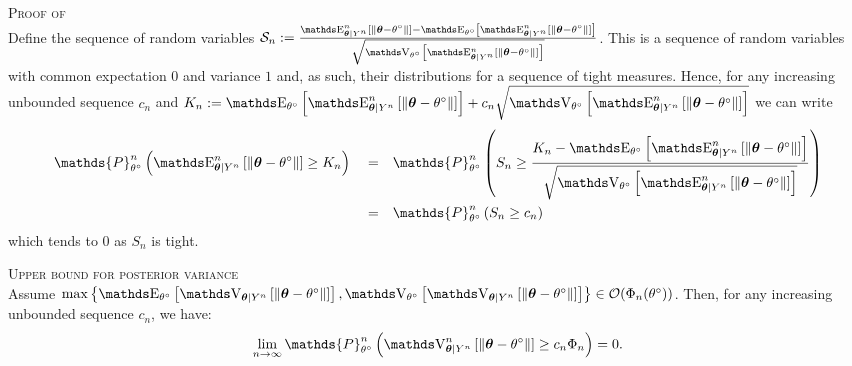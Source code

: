 \begin{pro}\label{pro2.4}{\textsc{Proof of }\\}
Define the sequence of random variables $\mathcal{S}_{n} := \frac{\E_{\boldsymbol{\theta} \vert Y^{n}}^{n}\left[\Vert \boldsymbol{\theta} - \theta^{\circ} \Vert \right] - \E_{\theta^{\circ}}\left[\E_{\boldsymbol{\theta} \vert Y^{n}}^{n}\left[\Vert \boldsymbol{\theta} - \theta^{\circ} \Vert \right]\right]}{\sqrt{\V_{\theta^{\circ}}\left[\E_{\boldsymbol{\theta} \vert Y^{n}}^{n}\left[\Vert \boldsymbol{\theta} - \theta^{\circ} \Vert \right]\right]}}$.
This is a sequence of random variables with common expectation $0$ and variance $1$ and, as such, their distributions for a sequence of tight measures.
Hence, for any increasing unbounded sequence $c_{n}$ and $K_{n} := \E_{\theta^{\circ}}\left[\E_{\boldsymbol{\theta} \vert Y^{n}}^{n}\left[\Vert \boldsymbol{\theta} - \theta^{\circ} \Vert \right]\right] + c_{n} \sqrt{\V_{\theta^{\circ}}\left[\E_{\boldsymbol{\theta} \vert Y^{n}}^{n}\left[\Vert \boldsymbol{\theta} - \theta^{\circ} \Vert \right]\right]}$ we can write
\begin{alignat*}{3}
& \mathds{P}_{\theta^{\circ}}^{n}\left(\E_{\boldsymbol{\theta} \vert Y^{n}}^{n}\left[\Vert \boldsymbol{\theta} - \theta^{\circ} \Vert \right] \geq K_{n}\right) && = && \mathds{P}_{\theta^{\circ}}^{n}\left(S_{n} \geq \frac{K_{n} - \E_{\theta^{\circ}}\left[\E_{\boldsymbol{\theta} \vert Y^{n}}^{n}\left[\Vert \boldsymbol{\theta} - \theta^{\circ} \Vert \right]\right]}{\sqrt{\V_{\theta^{\circ}}\left[\E_{\boldsymbol{\theta} \vert Y^{n}}^{n}\left[\Vert \boldsymbol{\theta} - \theta^{\circ} \Vert \right]\right]}}\right)\\
& &&=&& \mathds{P}_{\theta^{\circ}}^{n}\left(S_{n} \geq c_{n}\right)
\end{alignat*}
which tends to $0$ as $S_{n}$ is tight.
\end{pro}

\begin{lm}\label{lm2.4}{\textsc{Upper bound for posterior variance}\\}
Assume $\max\left\{ \E_{\theta^{\circ}}\left[\V_{\boldsymbol{\theta} \vert Y^{n}}\left[\Vert \boldsymbol{\theta} - \theta^{\circ} \Vert\right]\right], \V_{\theta^{\circ}}\left[ \V_{\boldsymbol{\theta} \vert Y^{n}}\left[\Vert \boldsymbol{\theta} - \theta^{\circ} \Vert\right]\right] \right\} \in \mathcal{O}(\Phi_{n}(\theta^{\circ}))$.
Then, for any increasing unbounded sequence $c_{n}$, we have:
\[\lim\limits_{n \rightarrow \infty} \mathds{P}_{\theta^{\circ}}^{n}\left(\V_{\boldsymbol{\theta} \vert Y^{n}}^{n}\left[\Vert \boldsymbol{\theta} - \theta^{\circ} \Vert \right] \geq c_{n}\Phi_{n}\right) = 0.\]
\end{lm}


